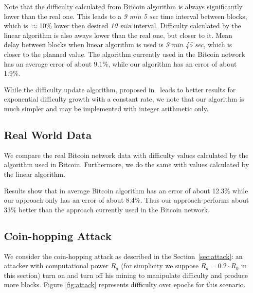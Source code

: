 \documentclass[]{llncs}
\newcommand{\attackname}{coin-hopping attack}
\newcommand{\AttackName}{Coin-hopping Attack}
\begin{document}
Note that the difficulty calculated from Bitcoin algorithm is always significantly lower than the real one.
This leads to a {\em 9 min 5 sec} time interval between blocks, which is $\approx$10\% lower then desired {\em 10 min} interval.
Difficulty calculated by the linear algorithm is also aways lower than the real one, but closer to it.
Mean delay between blocks when linear algorithm is used is {\em 9 min 45 sec}, which is closer to the planned value. The algorithm currently used in the Bitcoin network has an average error of about 9.1\%, while our algorithm has an error of about 1.9\%.

While the difficulty update algorithm, proposed in~\cite{kraft2015difficulty} leads to better results for exponential difficulty growth with a constant rate, we note that our algorithm is much simpler and may be implemented with integer arithmetic only.

\subsection{Real World Data}

We compare the real Bitcoin network data with difficulty values calculated by the algorithm used in Bitcoin. Furthermore, we do the same with values calculated by the linear algorithm. %


Results show that in average Bitcoin algorithm has an error of about 12.3\% while our approach only has an error of about 8.4\%. Thus  our approach performs about 33\% better than the approach currently used in the Bitcoin network.

\subsection{\AttackName}

We consider the \attackname{} as described in the Section~\ref{sec:attack}: an attacker with computational power \(R_a\) (for simplicity we suppose \(R_a=0.2 \cdot R_0 \) in this section) turn on and turn off his mining to manipulate difficulty and produce more blocks.
Figure \ref{fig:attack} represents difficulty over epochs for this scenario.
\end{document}

